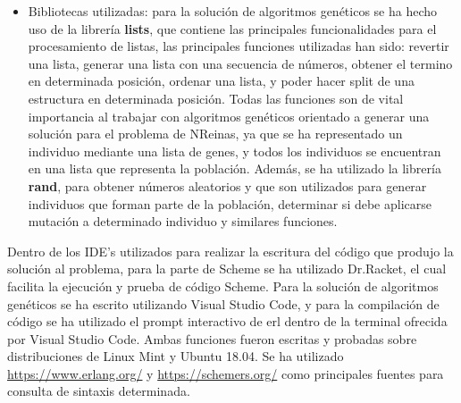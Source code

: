 \documentclass[12pt,a4paper]{article}
\begin{document}
\begin{enumerate}
\begin{itemize}
 \item Bibliotecas utilizadas: para la solución de algoritmos genéticos se ha hecho uso de la librería \textbf{lists}, que contiene las principales funcionalidades para el procesamiento de listas, las principales funciones utilizadas han sido: revertir una lista, generar una lista con una secuencia de números, obtener el termino en determinada posición, ordenar una lista, y poder hacer split de una estructura en determinada posición. Todas las funciones son de vital importancia al trabajar con algoritmos genéticos orientado a generar una solución para el problema de NReinas, ya que se ha representado un individuo mediante una lista de genes, y todos los individuos se encuentran en una lista que representa la población. Además, se ha utilizado la librería \textbf{rand}, para obtener números aleatorios y que son utilizados para generar individuos que forman parte de la población, determinar si debe aplicarse mutación a determinado individuo y similares funciones. 
 \end{itemize}
\end{enumerate}
Dentro de los IDE's utilizados para realizar la escritura del código que produjo la solución al problema, para la parte de Scheme se ha utilizado Dr.Racket, el cual facilita la ejecución y prueba de código Scheme. Para la solución de algoritmos genéticos se ha escrito utilizando Visual Studio Code, y para la compilación de código se ha utilizado el prompt interactivo de erl dentro de la terminal ofrecida por Visual Studio Code. Ambas funciones fueron escritas y probadas sobre distribuciones de Linux Mint y Ubuntu 18.04. Se ha utilizado \url{https://www.erlang.org/} y \url{https://schemers.org/} como principales fuentes para consulta de sintaxis determinada.

\pagebreak
\end{document}
